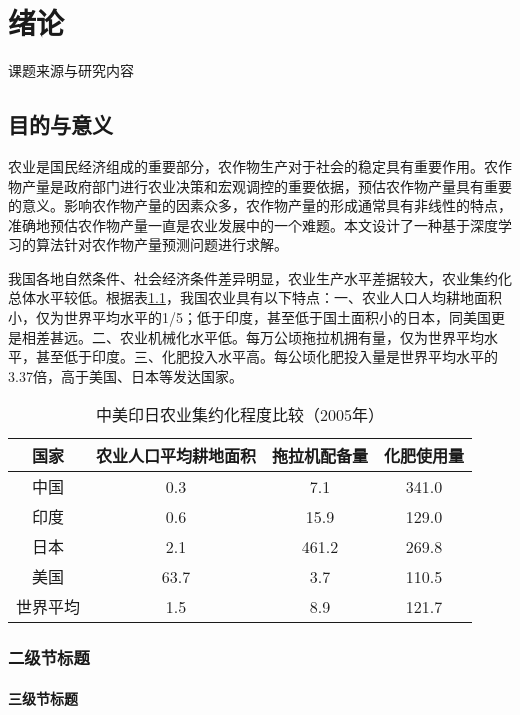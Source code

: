 \chapter{绪论}

课题来源与研究内容

\section{目的与意义}

农业是国民经济组成的重要部分，农作物生产对于社会的稳定具有重要作用。农作物产量是政府部门进行农业决策和宏观调控的重要依据，预估农作物产量具有重要的意义。影响农作物产量的因素众多，农作物产量的形成通常具有非线性的特点，准确地预估农作物产量一直是农业发展中的一个难题。本文设计了一种基于深度学习的算法针对农作物产量预测问题进行求解。

我国各地自然条件、社会经济条件差异明显，农业生产水平差据较大，农业集约化总体水平较低。根据表\ref{tab:intro1}，我国农业具有以下特点：一、农业人口人均耕地面积小，仅为世界平均水平的1/5；低于印度，甚至低于国土面积小的日本，同美国更是相差甚远。二、农业机械化水平低。每万公顷拖拉机拥有量，仅为世界平均水平，甚至低于印度。三、化肥投入水平高。每公顷化肥投入量是世界平均水平的3.37倍，高于美国、日本等发达国家。 

\begin{table}[htbp]
    \centering
    \caption{中美印日农业集约化程度比较（2005年）}
    \label{tab:intro1}
    \begin{tabular}{cccc}
      \toprule
        国家 &  农业人口平均耕地面积 & 拖拉机配备量 & 化肥使用量\\
      \midrule
        中国 & 0.3 & 7.1 & 341.0 \\
        印度 & 0.6 & 15.9 & 129.0 \\
        日本 & 2.1 & 461.2 & 269.8 \\
        美国 & 63.7 & 3.7 & 110.5 \\
      \midrule
        世界平均 & 1.5 & 8.9 & 121.7 \\
      \bottomrule
    \end{tabular}
  \end{table}

\subsection{二级节标题}

\subsubsection{三级节标题}

